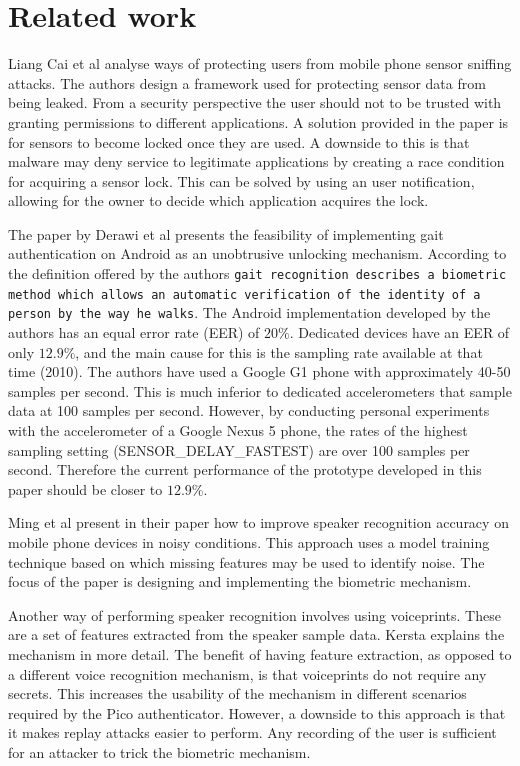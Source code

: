 \section{Related work}
Liang Cai et al \cite{cai2009defending} analyse ways of protecting users from mobile phone sensor sniffing attacks. The authors design a framework used for protecting sensor data from being leaked. From a security perspective the user should not to be trusted with granting permissions to different applications. A solution provided in the paper is for sensors to become locked once they are used. A downside to this is that malware may deny service to legitimate applications by creating a race condition for acquiring a sensor lock. This can be solved by using an user notification, allowing for the owner to decide which application acquires the lock.

The paper by Derawi et al \cite{derawi2010unobtrusive} presents the feasibility of implementing gait authentication on Android as an unobtrusive unlocking mechanism. According to the definition offered by the authors {\tt gait recognition describes a biometric method which allows an automatic verification of the identity of a person by the way he walks}. The Android implementation developed by the authors has an equal error rate (EER) of $20\%$. Dedicated devices have an EER of only $12.9\%$, and the main cause for this is the sampling rate available at that time (2010). The authors have used a Google G1 phone with approximately 40-50 samples per second. This is much inferior to dedicated accelerometers that sample data at 100 samples per second. However, by conducting personal experiments with the accelerometer of a Google Nexus 5 phone, the rates of the highest sampling setting (SENSOR\_DELAY\_FASTEST) are over 100 samples per second. Therefore the current performance of the prototype developed in this paper should be closer to $12.9\%$.

Ming et al \cite{ming2007robust} present in their paper how to improve speaker recognition accuracy on mobile phone devices in noisy conditions. This approach uses a model training technique based on which missing features may be used to identify noise. The focus of the paper is designing and implementing the biometric mechanism.

Another way of performing speaker recognition involves using voiceprints. These are a set of features extracted from the speaker sample data. Kersta \cite{kersta2005voiceprint} explains the mechanism in more detail. The benefit of having feature extraction, as opposed to a different voice recognition mechanism, is that voiceprints do not require any secrets. This increases the usability of the mechanism in different scenarios required by the Pico authenticator. However, a downside to this approach is that it makes replay attacks easier to perform. Any recording of the user is sufficient for an attacker to trick the biometric mechanism.

